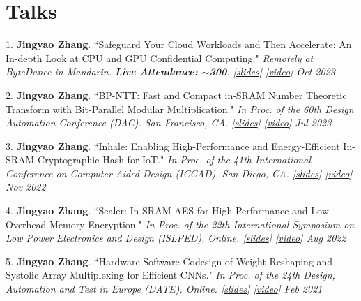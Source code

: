 \documentclass[letterpaper,11pt]{article}
\newcommand{\resumeSubHeadingListStart}{\begin{itemize}[leftmargin=0.15in, label={}]}
\newcommand{\resumeSubHeadingListEnd}{\end{itemize}}
\begin{document}
\section{Talks}
  \vspace{2pt}
  \resumeSubHeadingListStart
    \small{\item{
        1. \textbf{Jingyao Zhang}. ``Safeguard Your Cloud Workloads and Then Accelerate: An In-depth Look at CPU and GPU Confidential Computing." \textit{Remotely at ByteDance in Mandarin. \textbf{Live Attendance: $\sim$300}. \emph{[\href{https://jingyao-zhang.github.io/slides/ByteDance-Tech-Talk-Slides.pdf}{slides}] [\href{https://bytedance.feishu.cn/minutes/obcn35p3vg153yhg211a9jl8?from=auth_notice}{video}]}
        \hfill Oct 2023} \\ \vspace{3pt}
    
        2. \textbf{Jingyao Zhang}. ``BP-NTT: Fast and Compact in-SRAM Number Theoretic Transform with Bit-Parallel Modular Multiplication." \textit{In Proc. of the 60th Design Automation Conference (DAC). San Francisco, CA. 
        \emph{[\href{https://jingyao-zhang.github.io/slides/DAC-2023-Slides.pdf}{slides}]
        [\href{https://www.youtube.com/watch?v=iCul63P_v2E}{video}]}
        \hfill Jul 2023} \\ \vspace{3pt}

        
        3. \textbf{Jingyao Zhang}. ``Inhale: Enabling High-Performance and Energy-Efficient In-SRAM Cryptographic Hash for IoT." \textit{In Proc. of the 41th International Conference on Computer-Aided Design (ICCAD). San Diego, CA. 
        \emph{[\href{https://jingyao-zhang.github.io/slides/ICCAD-2022-Slides.pdf}{slides}]
        [\href{https://www.youtube.com/watch?v=e3KeH8AqGks}{video}]}
        \hfill Nov 2022} \\ \vspace{3pt}
        
        4. \textbf{Jingyao Zhang}. ``Sealer: In-SRAM AES for High-Performance and Low-Overhead Memory Encryption." \textit{In Proc. of the 22th International Symposium on Low Power Electronics and Design (ISLPED). Online.
        \emph{[\href{https://jingyao-zhang.github.io/slides/ISLPED-2022-Slides.pdf}{slides}]
        [\href{https://www.youtube.com/watch?v=mBx0Q7_Zk8c}{video}]}
        \hfill Aug 2022} \\ \vspace{3pt}
        
        5. \textbf{Jingyao Zhang}. ``Hardware-Software Codesign of Weight Reshaping and Systolic Array Multiplexing for Efficient CNNs." \textit{In Proc. of the 24th Design, Automation and Test in Europe (DATE). Online.
        \emph{[\href{https://jingyao-zhang.github.io/slides/DATE-2021-Slides.pdf}{slides}]
        [\href{https://www.youtube.com/watch?v=HiyUaztZrys}{video}]}
        \hfill Feb 2021}
    }}
  \resumeSubHeadingListEnd
\end{document}
